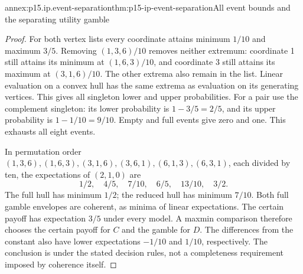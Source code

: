 \begin{annexitem}{annex:p15.ip.event-separation}{thm:p15-ip-event-separation}{All event bounds and the separating utility gamble}
\begin{proof}
For both vertex lists every coordinate attains minimum \(1/10\)
and maximum \(3/5\). Removing \((1,3,6)/10\) removes neither
extremum: coordinate 1 still attains its minimum at \((1,6,3)/10\),
and coordinate 3 still attains its maximum at \((3,1,6)/10\).
The other extrema also remain in the list. Linear evaluation on a
convex hull has the same extrema as evaluation on its generating
vertices. This gives all singleton lower and upper probabilities.
For a pair use the complement singleton: its lower probability is
\(1-3/5=2/5\), and its upper probability is \(1-1/10=9/10\).
Empty and full events give zero and one. This exhausts all eight events.

In permutation order
\((1,3,6),(1,6,3),(3,1,6),(3,6,1),(6,1,3),(6,3,1)\),
each divided by ten, the expectations of \((2,1,0)\) are
\[
                  1/2,\quad4/5,\quad7/10,\quad6/5,\quad13/10,\quad3/2.
\]
The full hull has minimum \(1/2\); the reduced hull has minimum
\(7/10\). Both full gamble envelopes are coherent, as minima of
linear expectations. The certain payoff has expectation \(3/5\)
under every model. A maxmin comparison therefore chooses the certain
payoff for \(C\) and the gamble for \(D\). The differences from
the constant also have lower expectations \(-1/10\) and \(1/10\),
respectively. The conclusion is under the stated decision rules, not
a completeness requirement imposed by coherence itself.
\end{proof}
\end{annexitem}

